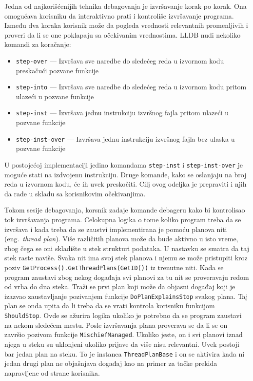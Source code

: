 \documentclass[12pt,oneside]{memoir}
\begin{document}
Jedna od najkorišćenijih tehnika debagovanja je izvršavanje korak po korak.
Ona omogućava korisniku da interaktivno prati i kontroliše izvršavanje programa.
Između dva koraka korisnik može da pogleda vrednosti relevantnih promenljivih i proveri da li se one poklapaju sa očekivanim vrednostima.
LLDB nudi nekoliko komandi za koračanje:
\begin{itemize}
  \item \verb|step-over| --- Izvršava sve naredbe do sledećeg reda u izvornom kodu preskačući pozvane funkcije
  \item \verb|step-into| --- Izvršava sve naredbe do sledećeg reda u izvornom kodu pritom ulazeći u pozvane funkcije
  \item \verb|step-inst| --- Izvršava jednu instrukciju izvršnog fajla pritom ulazeći u pozvane funkcije
  \item \verb|step-inst-over| --- Izvršava jednu instrukciju izvršnog fajla bez ulaska u pozvane funkcije
\end{itemize}
U postojećoj implementaciji jedino komandama \verb|step-inst| i \verb|step-inst-over| je moguće stati na izdvojenu instrukciju.
Druge komande, kako se oslanjaju na broj reda u izvornom kodu, će ih uvek preskočiti.
Cilj ovog odeljka je prepraviti i njih da rade u skladu sa korisnikovim očekivanjima.

Tokom sesije debagovanja, korsnik zadaje komande debageru kako bi kontrolisao tok izvršavanja programa.
Celokupna logika o tome koliko program treba da se izvršava i kada treba da se zaustvi implementirana je pomoću planova niti (eng.~{\em thread plan}).
Više različitih planova može da bude aktivno u isto vreme, zbog čega se oni skladište u stek strukturi podataka.
U nastavku se smatra da taj stek raste naviše.
Svaka nit ima svoj stek planova i njemu se može pristupiti kroz poziv \verb|GetProcess().GetThreadPlans(GetID())| iz trenutne niti.
Kada se program zaustavi zbog nekog događaja svi planovi za tu nit se proveravaju redom od vrha do dna steka.
Traži se prvi plan koji može da objasni događaj koji je izazvao zaustavljanje pozivanjem funkcije \verb|DoPlanExplainsStop| svakog plana.
Taj plan se onda upita da li treba da se vrati kontrola korisniku funkcijom \verb|ShouldStop|.
Ovde se ažurira logika ukoliko je potrebno da se program zaustavi na nekom sledećem mestu.
Posle izvršavanja plana proverava se da li se on završio pozivom funkcije \verb|MischiefManaged|.
Ukoliko jeste, on i svi planovi iznad njega u steku su uklonjeni ukoliko prijave da više nisu relevantni.
Uvek postoji bar jedan plan na steku.
To je instanca \verb|ThreadPlanBase| i on se aktivira kada ni jedan drugi plan ne objašnjava događaj kao na primer za tačke prekida napravljene od strane korisnika.
\end{document}
